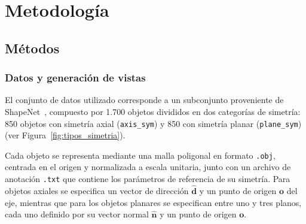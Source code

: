 
\chapter{Metodología}

\section{Métodos}
\subsection{Datos y generación de vistas}

El conjunto de datos utilizado corresponde a un subconjunto proveniente de
ShapeNet~\cite{chang2015shapenet}, compuesto por 1.700 objetos divididos en
dos categorías de simetría: 850 objetos con simetría axial (\texttt{axis\_sym})
y 850 con simetría planar (\texttt{plane\_sym}) (ver Figura~\ref{fig:tipos_simetria}).

Cada objeto se representa mediante una malla poligonal en formato \texttt{.obj},
centrada en el origen y normalizada a escala unitaria, junto con un archivo de
anotación \texttt{.txt} que contiene los parámetros de referencia de su simetría.
Para objetos axiales se especifica un vector de dirección $\hat{\mathbf{d}}$ y un
punto de origen $\mathbf{o}$ del eje, mientras que para los objetos planares se
especifican entre uno y tres planos, cada uno definido por su vector normal
$\hat{\mathbf{n}}$ y un punto de origen $\mathbf{o}$.

